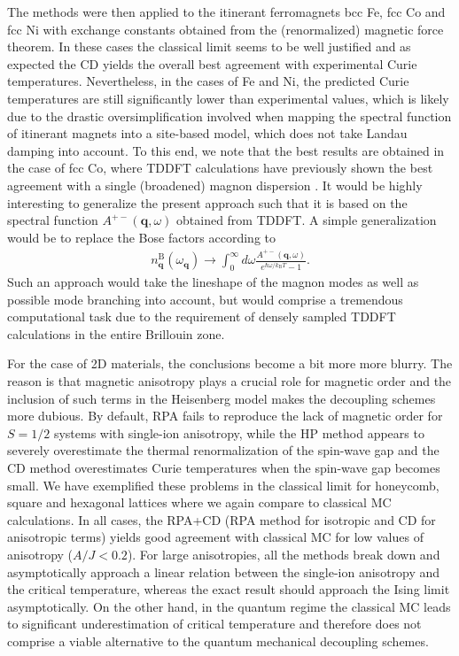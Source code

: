 \documentclass[aps,prb,reprint,floatfix,superscriptaddress]{revtex4-2}
\begin{document}
The methods were then applied to the itinerant ferromagnets bcc Fe, fcc Co and fcc Ni with exchange constants obtained from the (renormalized) magnetic force theorem. In these cases the classical limit seems to be well justified and as expected the CD yields the overall best agreement with experimental Curie temperatures. Nevertheless, in the cases of Fe and Ni, the predicted Curie temperatures are still significantly lower than experimental values, which is likely due to the drastic oversimplification involved when mapping the spectral function of itinerant magnets into a site-based model, which does not take Landau damping into account. To this end, we note that the best results are obtained in the case of fcc Co, where TDDFT calculations have previously shown the best agreement with a single (broadened) magnon dispersion \cite{Skovhus2021}. It would be highly interesting to generalize the present approach such that it is based on the spectral function $A^{+-}(\mathbf{q},\omega)$ obtained from TDDFT. A simple generalization would be to replace the Bose factors according to \cite{Paischer2021}
\begin{align}
n^\mathrm{B}_\mathbf{q}(\omega_\mathbf{q})\rightarrow\int_0^\infty d\omega\frac{A^{+-}(\mathbf{q},\omega)}{e^{\hbar\omega/k_\mathrm{B}T}-1}.
\end{align}
Such an approach would take the lineshape of the magnon modes as well as possible mode branching into account, but would comprise a tremendous computational task due to the requirement of densely sampled TDDFT calculations in the entire Brillouin zone. %

For the case of 2D materials, the conclusions become a bit more more blurry. The reason is that magnetic anisotropy plays a crucial role for magnetic order and the inclusion of such terms in the Heisenberg model makes the decoupling schemes more dubious. By default, RPA fails to reproduce the lack of magnetic order for $S=1/2$ systems with single-ion anisotropy, while the HP method appears to severely overestimate the thermal renormalization of the spin-wave gap and the CD method overestimates Curie temperatures when the spin-wave gap becomes small. We have exemplified these problems in the classical limit for honeycomb, square and hexagonal lattices where we again compare to classical MC calculations. In all cases, the RPA+CD (RPA method for isotropic and CD for anisotropic terms) yields good agreement with classical MC for low values of anisotropy ($A/J<0.2$). For large anisotropies, all the methods break down and asymptotically approach a linear relation between the single-ion anisotropy and the critical temperature, whereas the exact result should approach the Ising limit asymptotically. On the other hand, in the quantum regime the classical MC leads to significant underestimation of critical temperature and therefore does not comprise a viable alternative to the quantum mechanical decoupling schemes.
\end{document}
